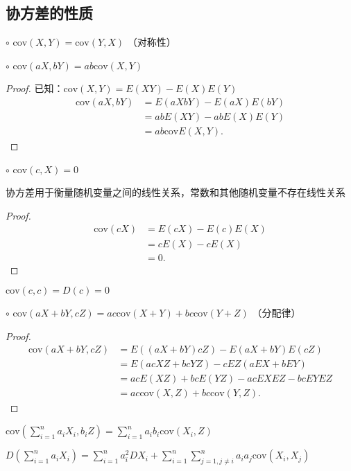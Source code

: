 \subsection{协方差的性质}%
\label{sub:协方差的性质}
$\circ$ $\text{cov}\left( X,Y \right) =\text{cov}\left( Y,X \right) $ （对称性）

$\circ$ $\text{cov}\left( aX,bY \right) =ab\text{cov}\left( X,Y \right) $ 
\begin{proof}
    已知：$\text{cov}\left( X,Y \right) =E\left( XY \right) -E\left( X \right) E\left( Y \right) $
    \begin{align*}
        \text{cov}\left( aX,bY \right) &=E\left( aXbY \right) -E\left( aX \right) E\left( bY \right) \\
        &= abE\left( XY \right) -abE\left( X \right) E\left( Y \right)  \\
        &= ab\text{cov}E\left( X,Y \right)
    .\end{align*}
\end{proof}

$\circ$ $\text{cov}\left( c,X \right) =0$ 
\begin{notation}
    协方差用于衡量随机变量之间的线性关系，常数和其他随机变量不存在线性关系
\end{notation}
\begin{proof}
    \begin{align*}
        \text{cov}\left( cX \right) &= E\left( cX \right) -E\left( c \right) E\left( X \right)  \\
        &= cE\left( X \right) -cE\left( X \right)  \\
        &= 0
    .\end{align*}
\end{proof}
\begin{notation}
    $\text{cov}\left( c,c \right) =D\left( c \right) =0$
\end{notation}

$\circ$ $\text{cov}\left( aX+bY ,cZ\right) =ac\text{cov}\left( X+Y \right) +bc\text{cov}\left( Y+Z \right) $ （分配律）
\begin{proof}
    \begin{align*}
        \text{cov}\left( aX+bY,cZ \right) &=E\left( \left( aX+bY \right) cZ \right) -E\left( aX+bY \right) E\left( cZ \right) \\
        &= E\left( acXZ+bcYZ \right) -cEZ\left( aEX+bEY \right)  \\
        &= acE\left( XZ \right) +bcE\left( YZ \right) -acEXEZ-bcEYEZ \\
        &= ac\text{cov}\left( X,Z \right) +bc\text{cov}\left( Y,Z \right)
    .\end{align*}
\end{proof}
\begin{notation}
    ${\text{cov}\left( \sum_{i=1}^{n}a_iX_i,b_iZ\right) =\sum_{i=1}^{n} a_ib_i\text{cov}\left( X_i,Z \right) }$
\end{notation}
\begin{notation}
    ${D\left( \sum_{i=1}^{n} a_iX_i \right) =\sum_{i=1}^{n} a_i^2DX_i+\sum_{i=1}^{n} \sum_{j=1,j\neq i}^{n} a_ia_j\text{cov}\left( X_i,X_j \right) }$
\end{notation}

